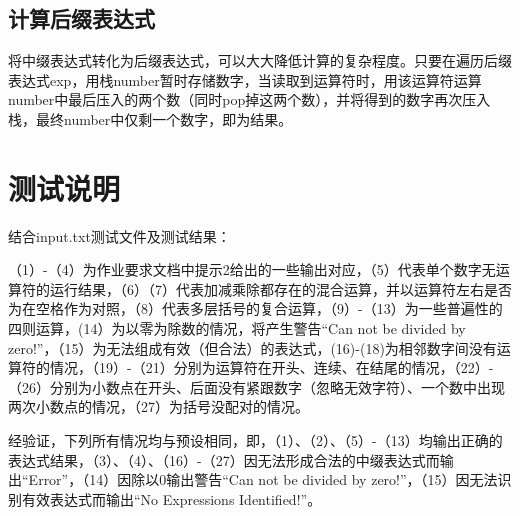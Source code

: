 \documentclass{ctexart}
\begin{document}
\subsection{计算后缀表达式}
将中缀表达式转化为后缀表达式，可以大大降低计算的复杂程度。只要在遍历后缀表达式exp，用栈number暂时存储数字，当读取到运算符时，用该运算符运算number中最后压入的两个数（同时pop掉这两个数），并将得到的数字再次压入栈，最终number中仅剩一个数字，即为结果。
\section{测试说明}
结合input.txt测试文件及测试结果：\par
（1）-（4）为作业要求文档中提示2给出的一些输出对应，（5）代表单个数字无运算符的运行结果，（6）（7）代表加减乘除都存在的混合运算，并以运算符左右是否为在空格作为对照，（8）代表多层括号的复合运算，（9）-（13）为一些普遍性的四则运算，(14）为以零为除数的情况，将产生警告“Can not be divided by zero!”，（15）为无法组成有效（但合法）的表达式，(16)-(18)为相邻数字间没有运算符的情况，（19）-（21）分别为运算符在开头、连续、在结尾的情况，（22）-（26）分别为小数点在开头、后面没有紧跟数字（忽略无效字符）、一个数中出现两次小数点的情况，（27）为括号没配对的情况。\par
经验证，下列所有情况均与预设相同，即，（1）、（2）、（5）-（13）均输出正确的表达式结果，（3）、（4）、（16）-（27）因无法形成合法的中缀表达式而输出“Error”，（14）因除以0输出警告“Can not be divided by zero!”，（15）因无法识别有效表达式而输出“No Expressions Identified!”。
\end{document}
